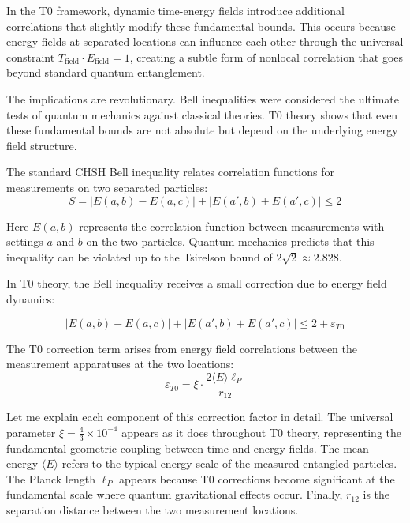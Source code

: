 \documentclass[12pt,a4paper]{article}
\newcommand{\xipar}{\xi}
\theoremstyle{definition}
\theoremstyle{remark}
\begin{document}
In the T0 framework, dynamic time-energy fields introduce additional correlations that slightly modify these fundamental bounds. This occurs because energy fields at separated locations can influence each other through the universal constraint $T_{\text{field}} \cdot E_{\text{field}} = 1$, creating a subtle form of nonlocal correlation that goes beyond standard quantum entanglement.

The implications are revolutionary. Bell inequalities were considered the ultimate tests of quantum mechanics against classical theories. T0 theory shows that even these fundamental bounds are not absolute but depend on the underlying energy field structure.

The standard CHSH Bell inequality relates correlation functions for measurements on two separated particles:
\begin{equation}
	S = |E(a,b) - E(a,c)| + |E(a',b) + E(a',c)| \leq 2
	\label{eq:standard_bell}
\end{equation}

Here $E(a,b)$ represents the correlation function between measurements with settings $a$ and $b$ on the two particles. Quantum mechanics predicts that this inequality can be violated up to the Tsirelson bound of $2\sqrt{2} \approx 2.828$.

In T0 theory, the Bell inequality receives a small correction due to energy field dynamics:

\begin{equation}
	\boxed{|E(a,b) - E(a,c)| + |E(a',b) + E(a',c)| \leq 2 + \varepsilon_{T0}}
	\label{eq:modified_bell}
\end{equation}

The T0 correction term arises from energy field correlations between the measurement apparatuses at the two locations:
\begin{equation}
	\varepsilon_{T0} = \xipar \cdot \frac{2\langle E \rangle \ell_P}{r_{12}}
	\label{eq:t0_bell_correction}
\end{equation}

Let me explain each component of this correction factor in detail. The universal parameter $\xipar = \frac{4}{3} \times 10^{-4}$ appears as it does throughout T0 theory, representing the fundamental geometric coupling between time and energy fields. The mean energy $\langle E \rangle$ refers to the typical energy scale of the measured entangled particles. The Planck length $\ell_P$ appears because T0 corrections become significant at the fundamental scale where quantum gravitational effects occur. Finally, $r_{12}$ is the separation distance between the two measurement locations.
\end{document}

